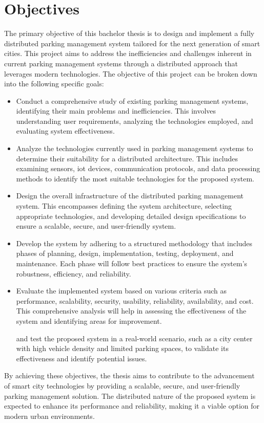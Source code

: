 \chapter{Objectives}\label{ch:objectives}

The primary objective of this bachelor thesis is to design and implement a fully distributed parking management system tailored for the next generation of smart cities. This project aims to address the inefficiencies and challenges inherent in current parking management systems through a distributed approach that leverages modern technologies. The objective of this project can be broken down into the following specific goals:

\begin{itemize}
  \item Conduct a comprehensive study of existing parking management systems, identifying their main problems and inefficiencies. This involves understanding user requirements, analyzing the technologies employed, and evaluating system effectiveness.

  \item Analyze the technologies currently used in parking management systems to determine their suitability for a distributed architecture. This includes examining sensors, \gls{iot} devices, communication protocols, and data processing methods to identify the most suitable technologies for the proposed system.

  \item Design the overall infrastructure of the distributed parking management system. This encompasses defining the system architecture, selecting appropriate technologies, and developing detailed design specifications to ensure a scalable, secure, and user-friendly system.

  \item Develop the system by adhering to a structured methodology that includes phases of planning, design, implementation, testing, deployment, and maintenance. Each phase will follow best practices to ensure the system’s robustness, efficiency, and reliability.

  \item Evaluate the implemented system based on various criteria such as performance, scalability, security, usability, reliability, availability, and cost. This comprehensive analysis will help in assessing the effectiveness of the system and identifying areas for improvement.

  \itemDeploy and test the proposed system in a real-world scenario, such as a city center with high vehicle density and limited parking spaces, to validate its effectiveness and identify potential issues.
\end{itemize}

By achieving these objectives, the thesis aims to contribute to the advancement of smart city technologies by providing a scalable, secure, and user-friendly parking management solution. The distributed nature of the proposed system is expected to enhance its performance and reliability, making it a viable option for modern urban environments.
